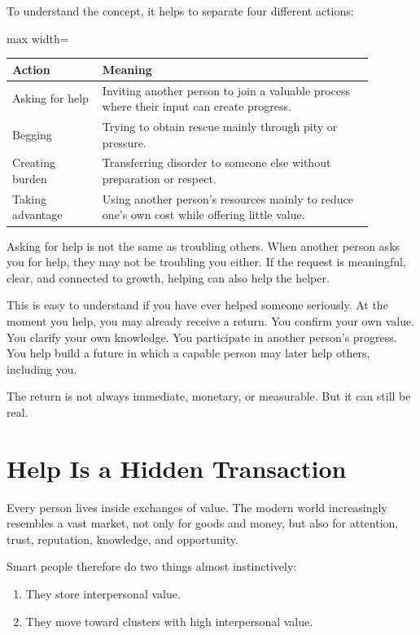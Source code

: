 To understand the concept, it helps to separate four different actions:

\begin{center}
\begin{adjustbox}{max width=\linewidth}
\begin{tabular}{p{0.22\linewidth} p{0.66\linewidth}}
\hline
\textbf{Action} & \textbf{Meaning} \\
\hline
Asking for help & Inviting another person to join a valuable process where their input can create progress. \\
Begging & Trying to obtain rescue mainly through pity or pressure. \\
Creating burden & Transferring disorder to someone else without preparation or respect. \\
Taking advantage & Using another person's resources mainly to reduce one's own cost while offering little value. \\
\hline
\end{tabular}
\end{adjustbox}
\end{center}

Asking for help is not the same as troubling others. When another person asks you for help, they may not be troubling you either. If the request is meaningful, clear, and connected to growth, helping can also help the helper.

This is easy to understand if you have ever helped someone seriously. At the moment you help, you may already receive a return. You confirm your own value. You clarify your own knowledge. You participate in another person's progress. You help build a future in which a capable person may later help others, including you.

The return is not always immediate, monetary, or measurable. But it can still be real.

\section*{Help Is a Hidden Transaction}

Every person lives inside exchanges of value. The modern world increasingly resembles a vast market, not only for goods and money, but also for attention, trust, reputation, knowledge, and opportunity.

Smart people therefore do two things almost instinctively:

\begin{enumerate}
\item They store interpersonal value.
\item They move toward clusters with high interpersonal value.
\end{enumerate}

